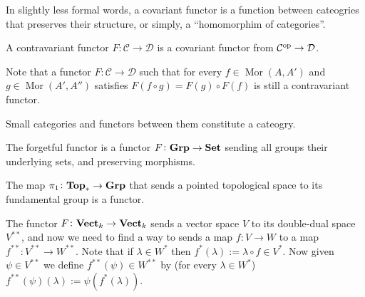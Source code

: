 \documentclass[11pt,a4paper]{article}
\DeclareMathOperator{\Mor}{Mor}
\newcommand{\cC}{\mathcal C}
\newcommand{\cD}{\mathcal D}
\begin{document}
\begin{remark}
  In slightly less formal words,
  a covariant functor is a function between cateogries that preserves
  their structure, or simply, a ``homomorphim of categories''.
\end{remark}

\begin{definition}
  A contravariant functor $F \colon \mathcal C \to \mathcal D$
  is a covariant functor from $\mathcal C^{\operatorname{op}} \to \mathcal D$.
\end{definition}

\begin{remark}
  Note that a functor $F \colon \cC \to \cD$ such that
  for every $f \in \Mor(A,A')$ and $g \in \Mor(A',A'')$ satisfies
  $F(f \circ g) = F(g) \circ F(f)$ is still a contravariant functor.
\end{remark}

\begin{remark}
  Small categories and functors between them constitute a cateogry.
\end{remark}

\begin{example}
  The forgetful functor is a functor $F \colon \mathbf{Grp} \to \mathbf{Set}$
  sending all groups their underlying sets,
  and preserving morphisms.
\end{example}

\begin{example}
  The map $\pi_1 \colon \mathbf{Top}_* \to \mathbf{Grp}$ that sends
  a pointed topological space to its fundamental group
  is a functor.
\end{example}

\begin{example}
  The functor $F \colon \mathbf{Vect}_k \to \mathbf{Vect}_k$ sends a vector space $V$
  to its double-dual space $V^{**}$,
  and now we need to find a way to sends a map $f \colon V \to W$
  to a map $f^{**} \colon V^{**} \to W^{**}$.
  Note that if $\lambda \in W^*$ then
  $f^*(\lambda) := \lambda \circ f \in V^*$.
  Now given $\psi \in V^{**}$ we define $f^{**}(\psi) \in W^{**}$ by
  (for every $\lambda \in W^*$) $f^{**}(\psi)(\lambda) := \psi(f^*(\lambda))$.
\end{example}
\end{document}
